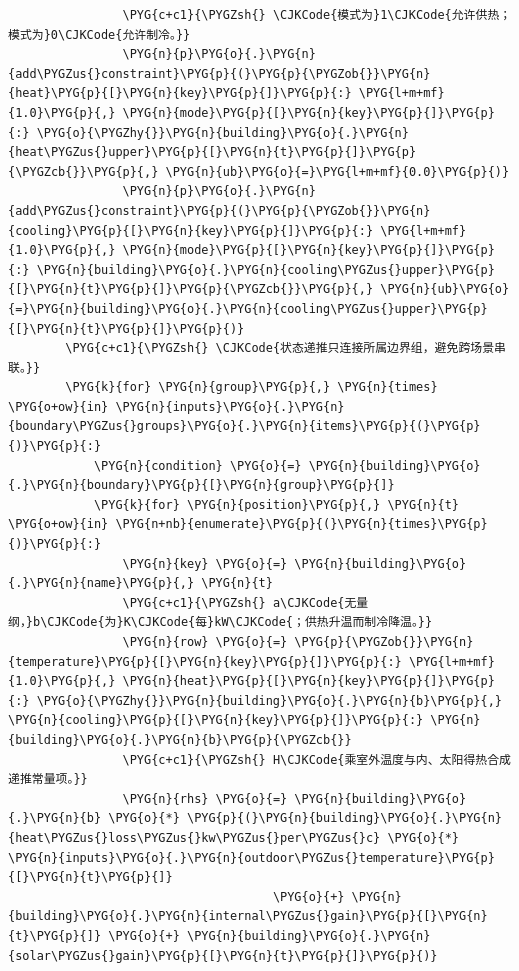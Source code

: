 \begin{Verbatim}
                \PYG{c+c1}{\PYGZsh{} \CJKCode{模式为}1\CJKCode{允许供热；模式为}0\CJKCode{允许制冷。}}
                \PYG{n}{p}\PYG{o}{.}\PYG{n}{add\PYGZus{}constraint}\PYG{p}{(}\PYG{p}{\PYGZob{}}\PYG{n}{heat}\PYG{p}{[}\PYG{n}{key}\PYG{p}{]}\PYG{p}{:} \PYG{l+m+mf}{1.0}\PYG{p}{,} \PYG{n}{mode}\PYG{p}{[}\PYG{n}{key}\PYG{p}{]}\PYG{p}{:} \PYG{o}{\PYGZhy{}}\PYG{n}{building}\PYG{o}{.}\PYG{n}{heat\PYGZus{}upper}\PYG{p}{[}\PYG{n}{t}\PYG{p}{]}\PYG{p}{\PYGZcb{}}\PYG{p}{,} \PYG{n}{ub}\PYG{o}{=}\PYG{l+m+mf}{0.0}\PYG{p}{)}
                \PYG{n}{p}\PYG{o}{.}\PYG{n}{add\PYGZus{}constraint}\PYG{p}{(}\PYG{p}{\PYGZob{}}\PYG{n}{cooling}\PYG{p}{[}\PYG{n}{key}\PYG{p}{]}\PYG{p}{:} \PYG{l+m+mf}{1.0}\PYG{p}{,} \PYG{n}{mode}\PYG{p}{[}\PYG{n}{key}\PYG{p}{]}\PYG{p}{:} \PYG{n}{building}\PYG{o}{.}\PYG{n}{cooling\PYGZus{}upper}\PYG{p}{[}\PYG{n}{t}\PYG{p}{]}\PYG{p}{\PYGZcb{}}\PYG{p}{,} \PYG{n}{ub}\PYG{o}{=}\PYG{n}{building}\PYG{o}{.}\PYG{n}{cooling\PYGZus{}upper}\PYG{p}{[}\PYG{n}{t}\PYG{p}{]}\PYG{p}{)}
        \PYG{c+c1}{\PYGZsh{} \CJKCode{状态递推只连接所属边界组，避免跨场景串联。}}
        \PYG{k}{for} \PYG{n}{group}\PYG{p}{,} \PYG{n}{times} \PYG{o+ow}{in} \PYG{n}{inputs}\PYG{o}{.}\PYG{n}{boundary\PYGZus{}groups}\PYG{o}{.}\PYG{n}{items}\PYG{p}{(}\PYG{p}{)}\PYG{p}{:}
            \PYG{n}{condition} \PYG{o}{=} \PYG{n}{building}\PYG{o}{.}\PYG{n}{boundary}\PYG{p}{[}\PYG{n}{group}\PYG{p}{]}
            \PYG{k}{for} \PYG{n}{position}\PYG{p}{,} \PYG{n}{t} \PYG{o+ow}{in} \PYG{n+nb}{enumerate}\PYG{p}{(}\PYG{n}{times}\PYG{p}{)}\PYG{p}{:}
                \PYG{n}{key} \PYG{o}{=} \PYG{n}{building}\PYG{o}{.}\PYG{n}{name}\PYG{p}{,} \PYG{n}{t}
                \PYG{c+c1}{\PYGZsh{} a\CJKCode{无量纲，}b\CJKCode{为}K\CJKCode{每}kW\CJKCode{；供热升温而制冷降温。}}
                \PYG{n}{row} \PYG{o}{=} \PYG{p}{\PYGZob{}}\PYG{n}{temperature}\PYG{p}{[}\PYG{n}{key}\PYG{p}{]}\PYG{p}{:} \PYG{l+m+mf}{1.0}\PYG{p}{,} \PYG{n}{heat}\PYG{p}{[}\PYG{n}{key}\PYG{p}{]}\PYG{p}{:} \PYG{o}{\PYGZhy{}}\PYG{n}{building}\PYG{o}{.}\PYG{n}{b}\PYG{p}{,} \PYG{n}{cooling}\PYG{p}{[}\PYG{n}{key}\PYG{p}{]}\PYG{p}{:} \PYG{n}{building}\PYG{o}{.}\PYG{n}{b}\PYG{p}{\PYGZcb{}}
                \PYG{c+c1}{\PYGZsh{} H\CJKCode{乘室外温度与内、太阳得热合成递推常量项。}}
                \PYG{n}{rhs} \PYG{o}{=} \PYG{n}{building}\PYG{o}{.}\PYG{n}{b} \PYG{o}{*} \PYG{p}{(}\PYG{n}{building}\PYG{o}{.}\PYG{n}{heat\PYGZus{}loss\PYGZus{}kw\PYGZus{}per\PYGZus{}c} \PYG{o}{*} \PYG{n}{inputs}\PYG{o}{.}\PYG{n}{outdoor\PYGZus{}temperature}\PYG{p}{[}\PYG{n}{t}\PYG{p}{]}
                                     \PYG{o}{+} \PYG{n}{building}\PYG{o}{.}\PYG{n}{internal\PYGZus{}gain}\PYG{p}{[}\PYG{n}{t}\PYG{p}{]} \PYG{o}{+} \PYG{n}{building}\PYG{o}{.}\PYG{n}{solar\PYGZus{}gain}\PYG{p}{[}\PYG{n}{t}\PYG{p}{]}\PYG{p}{)}

\end{Verbatim}
